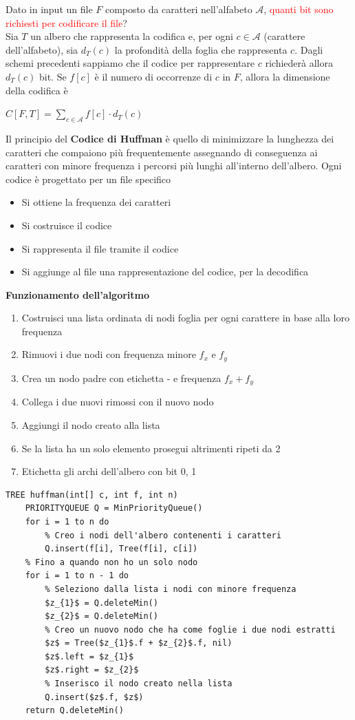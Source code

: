 \documentclass[../cheatSheetAlgoritmi.tex]{subfiles}
\begin{document}
Dato in input un file $F$ composto da caratteri nell'alfabeto $\mathcal{A}$, \textcolor{red}{quanti bit sono richiesti per codificare il file}?\\
Sia $T$ un albero che rappresenta la codifica e, per ogni $c \in \mathcal{A}$ (carattere dell'alfabeto), sia $d_{T}(c)$ la profondità della foglia che rappresenta $c$. Dagli schemi precedenti sappiamo che il codice per rappresentare $c$ richiederà allora $d_{T}(c)$ bit. Se $f[c]$ è il numero di occorrenze di $c$ in $F$, allora la dimensione della codifica è
\begin{center}
	$C[F, T] = \sum_{c \in \mathcal{A}} f[c] \cdot d_{T}(c)$
\end{center}
Il principio del \textbf{Codice di Huffman} è quello di minimizzare la lunghezza dei caratteri che compaiono più frequentemente assegnando di conseguenza ai caratteri con minore frequenza i percorsi più lunghi all'interno dell'albero. Ogni codice è progettato per un file specifico
\begin{itemize}
	\item Si ottiene la frequenza dei caratteri
	\item Si costruisce il codice
	\item Si rappresenta il file tramite il codice
	\item Si aggiunge al file una rappresentazione del codice, per la decodifica
\end{itemize}
\textbf{Funzionamento dell'algoritmo}
\begin{enumerate}
	\item Costruisci una lista ordinata di nodi foglia per ogni carattere in base alla loro frequenza
	\item Rimuovi i due nodi con frequenza minore $f_{x}$ e $f_{y}$
	\item Crea un nodo padre con etichetta - e frequenza $f_{x} + f_{y}$
	\item Collega i due nuovi rimossi con il nuovo nodo
	\item Aggiungi il nodo creato alla lista 
	\item Se la lista ha un solo elemento prosegui altrimenti ripeti da 2
	\item Etichetta gli archi dell'albero con bit 0, 1
\end{enumerate}
\begin{lstlisting}[caption=creazione albero binario di decodifica]
TREE huffman(int[] c, int f, int n)
	PRIORITYQUEUE Q = MinPriorityQueue()
	for i = 1 to n do
		% Creo i nodi dell'albero contenenti i caratteri
		Q.insert(f[i], Tree(f[i], c[i])
	% Fino a quando non ho un solo nodo
	for i = 1 to n - 1 do
		% Seleziono dalla lista i nodi con minore frequenza
		$z_{1}$ = Q.deleteMin()
		$z_{2}$ = Q.deleteMin()
		% Creo un nuovo nodo che ha come foglie i due nodi estratti
		$z$ = Tree($z_{1}$.f + $z_{2}$.f, nil)
		$z$.left = $z_{1}$
		$z$.right = $z_{2}$
		% Inserisco il nodo creato nella lista
		Q.insert($z$.f, $z$)
	return Q.deleteMin()
\end{lstlisting}
\end{document}
